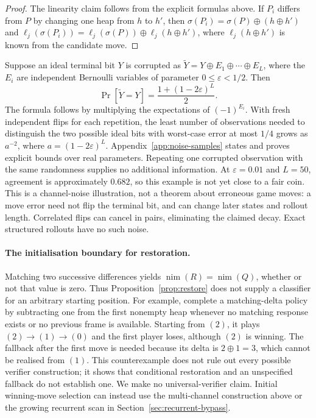 \documentclass[twoside,11pt]{article}
\numberwithin{theorem}{section}
\numberwithin{equation}{section}
\begin{document}
\begin{proof}
The linearity claim follows from the explicit formulas above.
If $P_i$ differs from $P$ by changing one heap from $h$ to $h'$, then $\sigma(P_i)=\sigma(P)\oplus(h\oplus h')$ and $\ell_j(\sigma(P_i))=\ell_j(\sigma(P))\oplus \ell_j(h\oplus h')$, where $\ell_j(h\oplus h')$ is known from the candidate move.
\end{proof}

\begin{remark}
\label{rem:noisy-rollout-decay}
Suppose an ideal terminal bit $Y$ is corrupted as $\widetilde Y=Y\oplus E_1\oplus\cdots\oplus E_L$, where the $E_i$ are independent Bernoulli variables of parameter $0\le\varepsilon<1/2$. Then
\[
\Pr[\widetilde Y=Y]=\frac{1+(1-2\varepsilon)^L}{2}.
\]
The formula follows by multiplying the expectations of $(-1)^{E_i}$. With fresh independent flips for each repetition, the least number of observations needed to distinguish the two possible ideal bits with worst-case error at most $1/4$ grows as $a^{-2}$, where $a=(1-2\varepsilon)^L$. Appendix~\ref{app:noise-samples} states and proves explicit bounds over real parameters. Repeating one corrupted observation with the same randomness supplies no additional information.
At $\varepsilon=0.01$ and $L=50$, agreement is approximately $0.682$, so this example is not yet close to a fair coin.
This is a channel-noise illustration, not a theorem about erroneous game moves: a move error need not flip the terminal bit, and can change later states and rollout length. Correlated flips can cancel in pairs, eliminating the claimed decay. Exact structured rollouts have no such noise.
\end{remark}

\paragraph{The initialisation boundary for restoration.}
Matching two successive differences yields $\operatorname{nim}(R)=\operatorname{nim}(Q)$, whether or not that value is zero. Thus Proposition~\ref{prop:restore} does not supply a classifier for an arbitrary starting position.
For example, complete a matching-delta policy by subtracting one from the first nonempty heap whenever no matching response exists or no previous frame is available. Starting from $(2)$, it plays $(2)\to(1)\to(0)$ and the first player loses, although $(2)$ is winning. The fallback after the first move is needed because its delta is $2\oplus1=3$, which cannot be realised from $(1)$.
This counterexample does not rule out every possible verifier construction; it shows that conditional restoration and an unspecified fallback do not establish one. We make no universal-verifier claim. Initial winning-move selection can instead use the multi-channel construction above or the growing recurrent scan in Section~\ref{sec:recurrent-bypass}.
\end{document}

